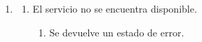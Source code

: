 \begin{framed}
\begin{description}
\begin{enumerate}
   \setcounter{enumi}{0}
   \renewcommand{\labelenumi}{}
   \renewcommand{\labelenumiii}{\arabic{enumiii}.}
   \renewcommand{\labelenumii}{\arabic{enumi}\alph{enumii}.}
      \item 
      \begin {enumerate}
         \setcounter{enumii}{0}
         \item El servicio no se encuentra disponible.
         \begin{enumerate}
         \item Se devuelve un estado de error.
         \end{enumerate}
      \end{enumerate}
   \end{enumerate}
\end{description}
 \FloatBarrier
\end{framed}

